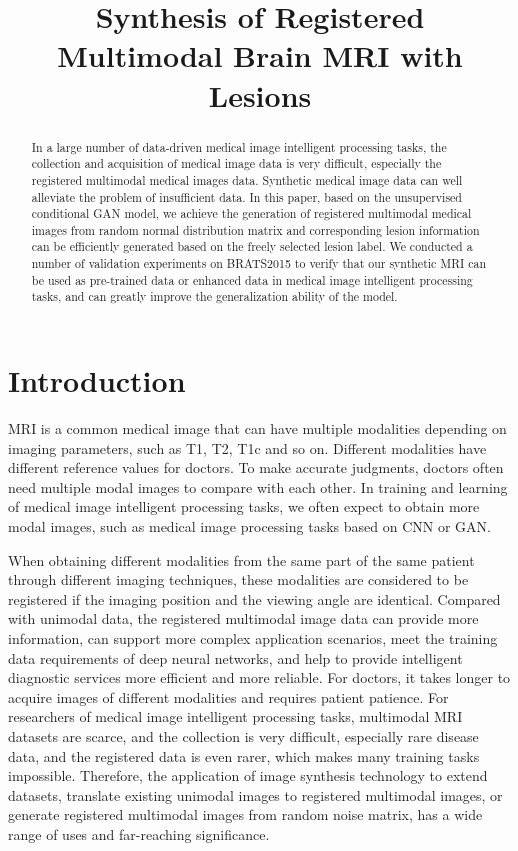 \documentclass[letterpaper]{article} %
\title{Synthesis of Registered Multimodal Brain MRI with Lesions}
\begin{document}
\maketitle

\begin{abstract}
In a large number of data-driven medical image intelligent processing tasks, the collection and acquisition of medical image data is very difficult, especially the registered multimodal medical images data. Synthetic medical image data can well alleviate the problem of insufficient data. In this paper, based on the unsupervised conditional GAN model, we achieve the generation of registered multimodal medical images from random normal distribution matrix and corresponding lesion information can be efficiently generated based on the freely selected lesion label. We conducted a number of validation experiments on BRATS2015 to verify that our synthetic MRI can be used as pre-trained data or enhanced data in medical image intelligent processing tasks, and can greatly improve the generalization ability of the model.
\end{abstract}
	
\section{Introduction}
MRI is a common medical image that can have multiple modalities depending on imaging parameters, such as T1, T2, T1c and so on. Different modalities have different reference values for doctors. To make accurate judgments, doctors often need multiple modal images to compare with each other. In training and learning of medical image intelligent processing tasks, we often expect to obtain more modal images, such as medical image processing tasks based on CNN\cite{86krizhevsky2012imagenet} or GAN\cite{25goodfellow2014generative}. 

When obtaining different modalities from the same part of the same patient  through different imaging techniques, these modalities are considered to be registered if the imaging position and the viewing angle are identical.  Compared with unimodal data, the registered multimodal image data can provide more information, can support more complex application scenarios, meet the training data requirements of deep neural networks, and help to provide  intelligent diagnostic services more efficient and more reliable. For doctors, it takes longer to acquire images of different modalities and requires patient patience. For researchers of medical image intelligent processing tasks, multimodal MRI datasets are scarce, and the collection is very difficult, especially rare disease data, and the registered data is even rarer, which makes many training tasks impossible. Therefore, the application of image synthesis technology to extend datasets, translate existing unimodal images to registered multimodal images, or generate registered multimodal images from random noise matrix, has a wide range of uses and far-reaching significance.
\end{document}
